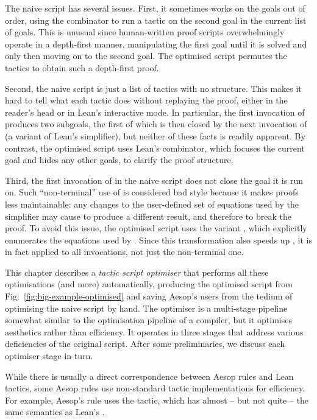 The naive script has several issues.
First, it sometimes works on the goals out of order, using the combinator  to run a tactic on the second goal in the current list of goals.
This is unusual since human-written proof scripts overwhelmingly operate in a depth-first manner, manipulating the first goal until it is solved and only then moving on to the second goal.
The optimised script permutes the tactics to obtain such a depth-first proof.

Second, the naive script is just a list of tactics with no structure.
This makes it hard to tell what each tactic does without replaying the proof, either in the reader's head or in Lean's interactive mode.
In particular, the first invocation of  produces two subgoals, the first of which is then closed by the next invocation of  (a variant of Lean's simplifier), but neither of these facts is readily apparent.
By contrast, the optimised script uses Lean's  combinator, which focuses the current goal and hides any other goals, to clarify the proof structure.

Third, the first invocation of  in the naive script does not close the goal it is run on.
Such \enquote{non-terminal} use of  is considered bad style because it makes proofs less maintainable: any changes to the user-defined set of equations used by the simplifier may cause  to produce a different result, and therefore to break the proof.
To avoid this issue, the optimised script uses the variant , which explicitly enumerates the equations used by .
Since this transformation also speeds up , it is in fact applied to all invocations, not just the non-terminal one.

This chapter describes a \emph{tactic script optimiser} that performs all these optimisations (and more) automatically, producing the optimised script from Fig.~\ref{fig:big-example-optimised} and saving Aesop's users from the tedium of optimising the naive script by hand.
The optimiser is a multi-stage pipeline somewhat similar to the optimisation pipeline of a compiler, but it optimises aesthetics rather than efficiency.
It operates in three stages that address various deficiencies of the original script.
After some preliminaries, we discuss each optimiser stage in turn.

While there is usually a direct correspondence between Aesop rules and Lean tactics, some Aesop rules use non-standard tactic implementations for efficiency.
For example, Aesop's  rule uses the  tactic, which has almost -- but not quite -- the same semantics as Lean's .

